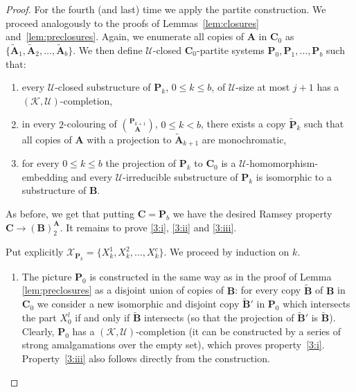 \documentclass{elsarticle}
\def\str#1{\mathbf {#1}}
\def\K{{\mathcal K}}
\theoremstyle{plain}
\theoremstyle{definition}
\theoremstyle{remark}
\begin{document}
\begin{proof}
For the fourth (and last) time we apply the partite construction. We proceed analogously to the proofs 
of Lemmas~\ref{lem:closures} and~\ref{lem:preclosures}.
Again, we enumerate all copies of $\str{A}$ in $\str{C}_0$  as  $\{\widetilde{\str{A}}_1, \widetilde{\str{A}}_2,\ldots, \widetilde{\str{A}}_b\}$.
We then define $\mathcal U$-closed $\str{C}_0$-partite systems $\str{P}_0, \str{P}_1, \ldots, \str{P}_b$ such that:
\begin{enumerate}[label=(\roman*)]
\item\label{3:i} every $\mathcal U$-closed substructure of $\str{P}_k$, $0\leq k\leq b$, of $\mathcal U$-size at most $j+1$ has a $(\K,\mathcal U)$-completion,
\item\label{3:ii} in every $2$-colouring of ${\str{P}_{k+1}}\choose{\str{A}}$, $0\leq k< b$, there exists a copy $\widetilde{\str{P}}_{k}$ such that all copies of $\str{A}$ with a projection to $\widetilde{\str{A}}_{k+1}$ are monochromatic,
\item\label{3:iii} for every $0\leq k\leq b$ the projection of $\str{P}_k$ to $\str{C}_0$ is a $\mathcal U$-homomorphism-embedding and every $\mathcal U$-irreducible substructure of $\str{P}_k$ is isomorphic to a substructure of $\str{B}$.
\end{enumerate}
As before, we get that putting $\str{C} = \str{P}_b$ we have the desired Ramsey property $\str{C}\longrightarrow (\str{B})^{\str{A}}_2$. It remains to prove \ref{3:i}, \ref{3:ii} and \ref{3:iii}.

Put explicitly $\mathcal X_{\str{P}_k} = \{X_k^1, X_k^2, \dots, X_k^c\}$.
We proceed by induction on $k$.

\begin{enumerate}
\item
The picture $\str{P}_0$ is constructed in the same way as in the proof of Lemma \ref{lem:preclosures} as a disjoint union of  copies of $\str{B}$: for every copy $\widetilde{\str{B}}$ of
$\str{B}$ in $\str{C}_0$ we consider a new isomorphic and disjoint copy $\widetilde{\str{B}}'$ in $\str{P}_0$ which intersects the part $X_0^l$  if and only if $\widetilde{\str{B}}$ intersects (so that the projection of $\widetilde{\str{B}}'$ is $\widetilde{\str{B}}$).
Clearly, $\str{P}_0$ has a $(\K,\mathcal U)$-completion (it can be constructed by a series of strong amalgamations over the empty set), which proves property~\ref{3:i}. Property~\ref{3:iii} also follows directly from the construction.


\end{enumerate}
\end{proof}
\end{document}
